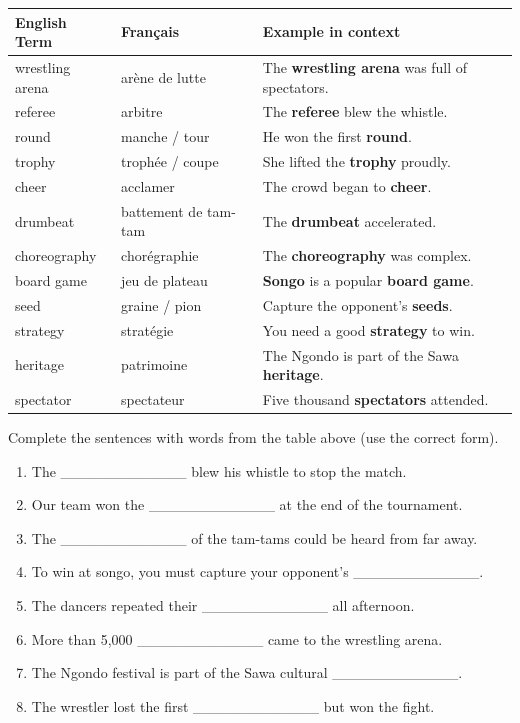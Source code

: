 \documentclass[11pt]{article}
\begin{document}
\begin{center}
\begin{tabularx}{\linewidth}{|l|X|X|}\hline
\rowcolor{popblueL}
\textbf{English Term} & \textbf{Français} & \textbf{Example in context} \\ \hline
wrestling arena & arène de lutte & The \textbf{wrestling arena} was full of spectators. \\ \hline
referee & arbitre & The \textbf{referee} blew the whistle. \\ \hline
round & manche / tour & He won the first \textbf{round}. \\ \hline
trophy & trophée / coupe & She lifted the \textbf{trophy} proudly. \\ \hline
cheer & acclamer & The crowd began to \textbf{cheer}. \\ \hline
drumbeat & battement de tam-tam & The \textbf{drumbeat} accelerated. \\ \hline
choreography & chorégraphie & The \textbf{choreography} was complex. \\ \hline
board game & jeu de plateau & \textbf{Songo} is a popular \textbf{board game}. \\ \hline
seed & graine / pion & Capture the opponent's \textbf{seeds}. \\ \hline
strategy & stratégie & You need a good \textbf{strategy} to win. \\ \hline
heritage & patrimoine & The Ngondo is part of the Sawa \textbf{heritage}. \\ \hline
spectator & spectateur & Five thousand \textbf{spectators} attended. \\ \hline
\end{tabularx}
\end{center}

\begin{exercice}
Complete the sentences with words from the table above (use the correct form).
\begin{enumerate}
\item The \_\_\_\_\_\_\_\_\_\_\_\_ blew his whistle to stop the match.
\item Our team won the \_\_\_\_\_\_\_\_\_\_\_\_ at the end of the tournament.
\item The \_\_\_\_\_\_\_\_\_\_\_\_ of the tam-tams could be heard from far away.
\item To win at songo, you must capture your opponent's \_\_\_\_\_\_\_\_\_\_\_\_.
\item The dancers repeated their \_\_\_\_\_\_\_\_\_\_\_\_ all afternoon.
\item More than 5,000 \_\_\_\_\_\_\_\_\_\_\_\_ came to the wrestling arena.
\item The Ngondo festival is part of the Sawa cultural \_\_\_\_\_\_\_\_\_\_\_\_.
\item The wrestler lost the first \_\_\_\_\_\_\_\_\_\_\_\_ but won the fight.
\end{enumerate}
\end{exercice}
\end{document}
